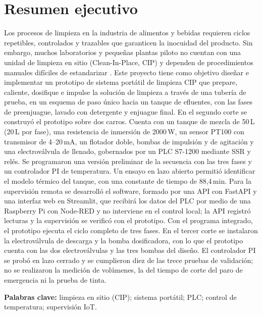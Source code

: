 \section*{Resumen ejecutivo}
Los procesos de limpieza en la industria de alimentos y bebidas requieren ciclos repetibles, controlados y trazables que garanticen la inocuidad del producto. Sin embargo, muchos laboratorios y pequeñas plantas piloto no cuentan con una unidad de limpieza en sitio (Clean-In-Place, CIP) y dependen de procedimientos manuales difíciles de estandarizar \cite{bowser2023cip}. Este proyecto tiene como objetivo diseñar e implementar un prototipo de sistema portátil de limpieza CIP que prepare, caliente, dosifique e impulse la solución de limpieza a través de una tubería de prueba, en un esquema de paso único hacia un tanque de efluentes, con las fases de preenjuague, lavado con detergente y enjuague final.
En el segundo corte se construyó el prototipo sobre dos carros. Cuenta con un tanque de mezcla de 50\,L (20\,L por fase), una resistencia de inmersión de 2000\,W, un sensor PT100 con transmisor de 4--20\,mA, un flotador doble, bombas de impulsión y de agitación y una electroválvula de llenado, gobernados por un PLC S7-1200 mediante SSR y relés. Se programaron una versión preliminar de la secuencia con las tres fases y un controlador PI de temperatura. Un ensayo en lazo abierto permitió identificar el modelo térmico del tanque, con una constante de tiempo de 88,4\,min. Para la supervisión remota se desarrolló el software, formado por una API con FastAPI y una interfaz web en Streamlit, que recibirá los datos del PLC por medio de una Raspberry Pi con Node-RED y no interviene en el control local; la API registró lecturas y la supervisión se verificó con el prototipo. Con el programa integrado, el prototipo ejecuta el ciclo completo de tres fases. En el tercer corte se instalaron la electroválvula de descarga y la bomba dosificadora, con lo que el prototipo cuenta con las dos electroválvulas y las tres bombas del diseño. El controlador PI se probó en lazo cerrado y se cumplieron diez de las trece pruebas de validación; no se realizaron la medición de volúmenes, la del tiempo de corte del paro de emergencia ni la prueba de tinta.

\textbf{Palabras clave:} limpieza en sitio (CIP); sistema portátil; PLC; control de temperatura; supervisión IoT.

